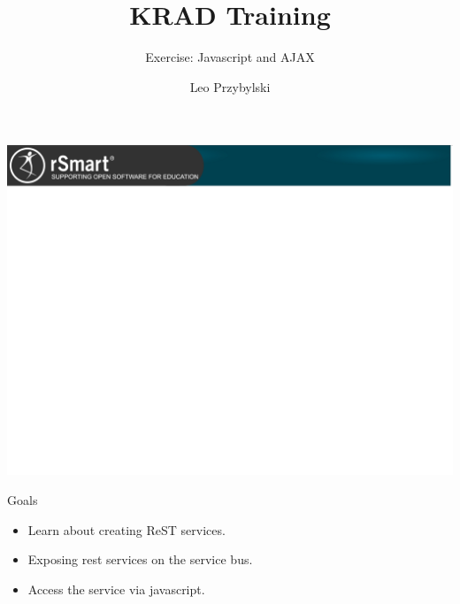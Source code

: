 \documentclass[xcolor=dvipsnames,14pt,professionalfonts]{beamer}
\begin{document}
\title{KRAD Training}
\subtitle{Exercise: Javascript and AJAX}
\author[Leo]{Leo Przybylski}

\usebackgroundtemplate%
{%
    \includegraphics[width=\paperwidth,height=\paperheight]{../img/header.png}%
}

{
%
\begin{frame}[plain]
  \titlepage
\end{frame}
}

\begin{frame}{Goals}
  \begin{itemize}
    \item Learn about creating ReST services.
    \item Exposing rest services on the service bus.
    \item Access the service via javascript.   
  \end{itemize}
\end{frame}
\end{document}
